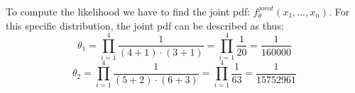 To compute the likelihood we have to find the joint pdf: $f_\theta^{joint}(x_1,\dotsc,x_n)$. For this specific distribution, the joint pdf can be described as thus:
$$
\theta_1 = \prod_{i=1}^4 \frac{1}{(4+1)\cdot(3+1)} = \prod_{i=1}^4 \frac{1}{20} = \frac{1}{160000}
$$
$$
\theta_2 = \prod_{i=1}^4 \frac{1}{(5+2)\cdot(6+3)} = \prod_{i=1}^4 \frac{1}{63} = \frac{1}{15752961}
$$